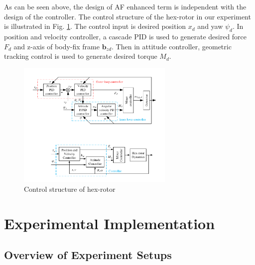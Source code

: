 \documentclass[letterpaper, 10 pt, conference]{ieeeconf}  %
\begin{document}
As can be seen above, the design of AF enhanced term is independent with the design of the controller.
The control structure of the hex-rotor in our experiment is illustrated in Fig. \ref{f6}.
The control input is desired position $x_d$ and yaw $\psi_d$.
In position and velocity controller, a cascade PID is used to generate desired force $F_d$ and z-axis of body-fix frame $\bm{b}_{zd}$.
Then in attitude controller, geometric tracking control \cite{Lee2010} is used to generate desired torque $M_d$.
\begin{figure}[t]
    \centering
    \includegraphics[width=2.95in]{illustrations/fig6.pdf}
    \caption{Control structure of hex-rotor}
    \label{f6}
\end{figure}

\section{Experimental Implementation}

\subsection{Overview of Experiment Setups}
\end{document}
